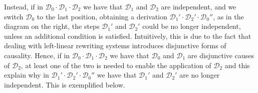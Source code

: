 \documentclass[a4paper,UKenglish,cleveref,pdftex,thm-restate,numberwithinsect]{lipics-v2021}
\newcommand{\dder}[1]{\mathscr{#1}}
\begin{document}
\noindent
\begin{minipage}{.8\textwidth}
  \setlength\parindent{1.5em}
  Instead, if in $\dder{D}_0\cdot \dder{D}_1 \cdot \dder{D}_2$ we have that $\dder{D}_1$ and $\dder{D}_2$ are
independent, and we switch $\dder{D}_0$ to the last position, obtaining a
derivation $\dder{D}_1'\cdot \dder{D}_2'\cdot  \dder{D}_0''$, as in the diagram on the right, the steps $\dder{D}_1'$ and $\dder{D}_2'$ could be no
longer independent, unless an additional condition is
satisfied. Intuitively, this is due to the fact that dealing with
left-linear rewriting systems introduces disjunctive forms of
causality. Hence, if in $\dder{D}_0\cdot \dder{D}_1\cdot \dder{D}_2$ we have that $\dder{D}_0$ and $\dder{D}_1$ are
disjunctive causes of $\dder{D}_2$, at least one of the two is needed to
enable the application of $\dder{D}_2$ and this explain why in
$\dder{D}_1'\cdot \dder{D}_2'\cdot \dder{D}_0''$ we have that $\dder{D}_1'$ and $\dder{D}_2'$ are no longer
independent. This is exemplified below.
\end{minipage}
\begin{minipage}{.18\textwidth}
\ \hspace{-14mm}
\end{minipage}
\end{document}
